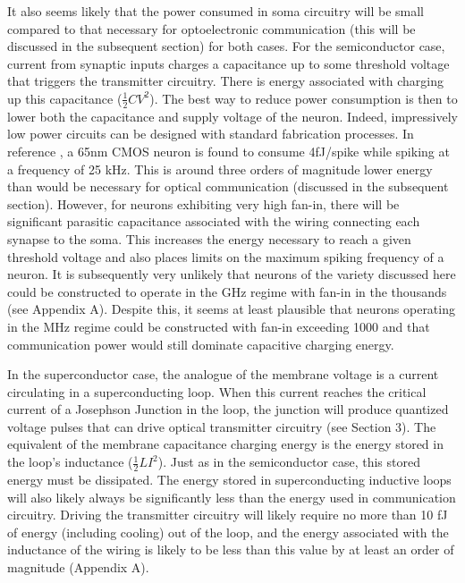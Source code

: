 \documentclass[twocolumn]{article}
\begin{document}
It also seems likely that the power consumed in soma circuitry will be small compared to that necessary for optoelectronic communication (this will be discussed in the subsequent section) for both cases. For the semiconductor case, current from synaptic inputs charges a capacitance up to some threshold voltage that triggers the transmitter circuitry. There is energy associated with charging up this capacitance ($\frac{1}{2}CV^2$). The best way to reduce power consumption is then to lower both the capacitance and supply voltage of the neuron. Indeed, impressively low power circuits can be designed with standard fabrication processes. In reference \cite{sourikopoulos20174}, a 65nm CMOS neuron is found to consume 4fJ/spike while spiking at a frequency of 25 kHz. This is around three orders of magnitude lower energy than would be necessary for optical communication (discussed in the subsequent section). However, for neurons exhibiting very high fan-in, there will be significant parasitic capacitance associated with the wiring connecting each synapse to the soma. This increases the energy necessary to reach a given threshold voltage and also places limits on the maximum spiking frequency of a neuron. It is subsequently very unlikely that neurons of the variety discussed here could be constructed to operate in the GHz regime with fan-in in the thousands (see Appendix A). Despite this, it seems at least plausible that neurons operating in the MHz regime could be constructed with fan-in exceeding 1000 and that communication power would still dominate capacitive charging energy.

In the superconductor case, the analogue of the membrane voltage is a current circulating in a superconducting loop. When this current reaches the critical current of a Josephson Junction in the loop, the junction will produce quantized voltage pulses that can drive optical transmitter circuitry (see Section 3). The equivalent of the membrane capacitance charging energy is the energy stored in the loop's inductance ($\frac{1}{2}LI^2$). Just as in the semiconductor case, this stored energy must be dissipated. The energy stored in superconducting inductive loops will also likely always be significantly less than the energy used in communication circuitry. Driving the transmitter circuitry will likely require no more than 10 fJ of energy (including cooling) out of the loop, and the energy associated with the inductance of the wiring is likely to be less than this value by at least an order of magnitude (Appendix A).
\end{document}
